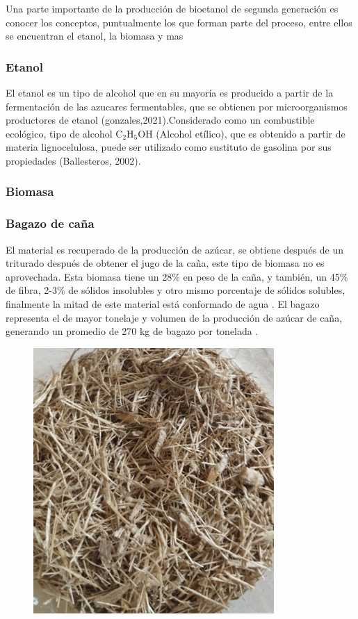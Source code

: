 \documentclass[12pt]{article}
\begin{document}
		
		Una parte  importante de la producción de bioetanol de segunda generación es conocer los conceptos, puntualmente los que forman parte del proceso, entre ellos se encuentran el etanol, la biomasa y mas 
		\subsubsection{Etanol}
		El etanol es un tipo de alcohol que en su mayoría es producido a partir de la  fermentación de las azucares fermentables, que se obtienen por microorganismos productores de etanol \cite{} (gonzales,2021).Considerado como un combustible ecológico, tipo de alcohol $\text{C}_2\text{H}_5\text{OH}$ (Alcohol etílico), que es obtenido a partir de materia lignocelulosa, puede ser utilizado como sustituto de gasolina por sus propiedades (Ballesteros, 2002).
		
		\subsubsection{Biomasa}
		
		\subsubsection{Bagazo de caña}
		El material es recuperado de la producción de azúcar, se obtiene después de un triturado después de obtener el jugo de la caña, este tipo de biomasa no es aprovechada. Esta biomasa tiene un 28\% en peso de la caña, y también, un 45\% de fibra, 2-3\% de sólidos insolubles y otro mismo porcentaje de sólidos solubles, finalmente la mitad de este material está conformado de agua \cite{olmo2015bagazo}.
		El bagazo representa el de mayor tonelaje y volumen de la producción de azúcar de caña, generando un promedio de 270 kg de bagazo por tonelada \cite{perez2022efecto}.
		
		\begin{figure}[h]
			\centering
			\includegraphics[width=0.4\linewidth]{imagenes/bagazo}
			\caption[Bagazo de caña]{}
			\label{fig:bagazo}
		\end{figure}
		
\end{document}
